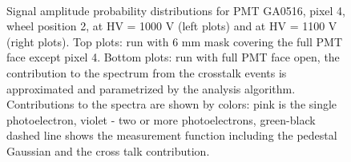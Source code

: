 \begin{figure}[hb] 
\centering 
  \hfill
   \\
  \hfill
  \caption{Signal amplitude probability distributions for PMT GA0516, pixel 4, wheel position 2, at HV = 1000 V (left plots) and at HV = 1100 V (right plots). Top plots: run with 6 mm mask covering the full PMT face except pixel 4. Bottom plots: run with full PMT face open, the contribution to the spectrum from the crosstalk events is approximated and parametrized by the analysis algorithm. Contributions to the spectra are shown by colors: pink is the single photoelectron, violet - two or more photoelectrons, green-black dashed line shows the measurement function including the pedestal Gaussian and the cross talk contribution. 
    }
\label{fig:GA0516_3}
\end{figure}

